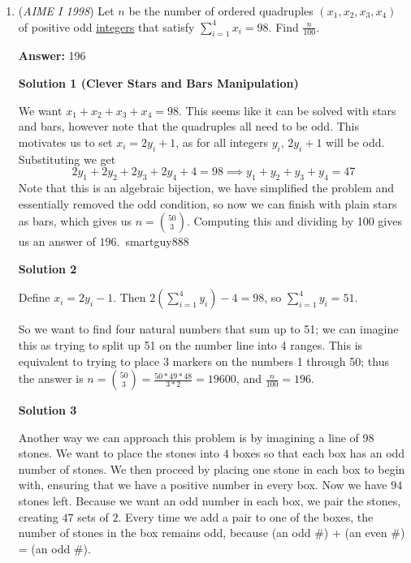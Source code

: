 \begin{enumerate}
 



\textbf{Solution 2}

We have $\triangle BRQ\sim \triangle DRC$ so $\frac{112}{RC} = \frac{BR}{DR}$. We also have $\triangle BRC \sim \triangle DRP$ so $\frac{ RC}{847} = \frac {BR}{DR}$. Equating the two results gives $\frac{112}{RC} =  \frac{ RC}{847}$ and so $RC^2=112*847$ which solves to $RC=\boxed{308}$



	\item (\textit{AIME I 1998}) Let $n$ be the number of ordered quadruples $(x_1,x_2,x_3,x_4)$ of positive odd \href{https://artofproblemsolving.com/wiki/index.php?title=Integer}{integers} that satisfy $\sum_{i = 1}^4 x_i = 98.$  Find $\frac n{100}.$

 \textbf{Answer: }196



\textbf{Solution 1 (Clever Stars and Bars Manipulation)}

We want $x_1 +x_2+x_3+x_4 =98$. This seems like it can be solved with stars and bars, however note that the quadruples all need to be odd. This motivates us to set $x_i= 2y_i +1$, as for all integers $y_i$, $2y_i + 1$ will be odd. Substituting we get 
 \[2y_1+2y_2+2y_3+2y_4 +4 = 98 \implies y_1+y_2+y_3+y_4 =47\]Note that this is an algebraic bijection, we have simplified the problem and essentially removed the odd condition, so now we can finish with plain stars as bars, which gives us $n= {50\choose3}$. Computing this and dividing by 100 gives us an answer of $\boxed{196}$.~smartguy888

 



\textbf{Solution 2}

Define $x_i = 2y_i - 1$. Then $2\left(\sum_{i = 1}^4 y_i\right) - 4 = 98$, so $\sum_{i = 1}^4 y_i = 51$. 

 So we want to find four natural numbers that sum up to 51; we can imagine this as trying to split up 51 on the number line into 4 ranges. This is equivalent to trying to place 3 markers on the numbers 1 through 50; thus the answer is $n = {50\choose3} = \frac{50 * 49 * 48}{3 * 2} = 19600$, and $\frac n{100} = \boxed{196}$.

 



\textbf{Solution 3}

Another way we can approach this problem is by imagining a line of 98 stones. We want to place the stones into $4$ boxes so that each box has an odd number of stones. We then proceed by placing one stone in each box to begin with, ensuring that we have a positive number in every box. Now we have $94$ stones left. Because we want an odd number in each box, we pair the stones, creating $47$ sets of $2$. Every time we add a pair to one of the boxes, the number of stones in the box remains odd, because (an odd \#) + (an even \#) = (an odd \#).


\end{enumerate}
